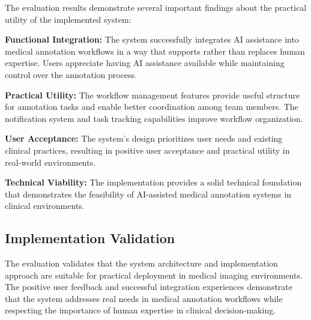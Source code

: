 The evaluation results demonstrate several important findings about the practical utility of the implemented system:

\textbf{Functional Integration:} The system successfully integrates AI assistance into medical annotation workflows in a way that supports rather than replaces human expertise. Users appreciate having AI assistance available while maintaining control over the annotation process.

\textbf{Practical Utility:} The workflow management features provide useful structure for annotation tasks and enable better coordination among team members. The notification system and task tracking capabilities improve workflow organization.

\textbf{User Acceptance:} The system's design prioritizes user needs and existing clinical practices, resulting in positive user acceptance and practical utility in real-world environments.

\textbf{Technical Viability:} The implementation provides a solid technical foundation that demonstrates the feasibility of AI-assisted medical annotation systems in clinical environments.

\subsection{Implementation Validation}

The evaluation validates that the system architecture and implementation approach are suitable for practical deployment in medical imaging environments. The positive user feedback and successful integration experiences demonstrate that the system addresses real needs in medical annotation workflows while respecting the importance of human expertise in clinical decision-making. 